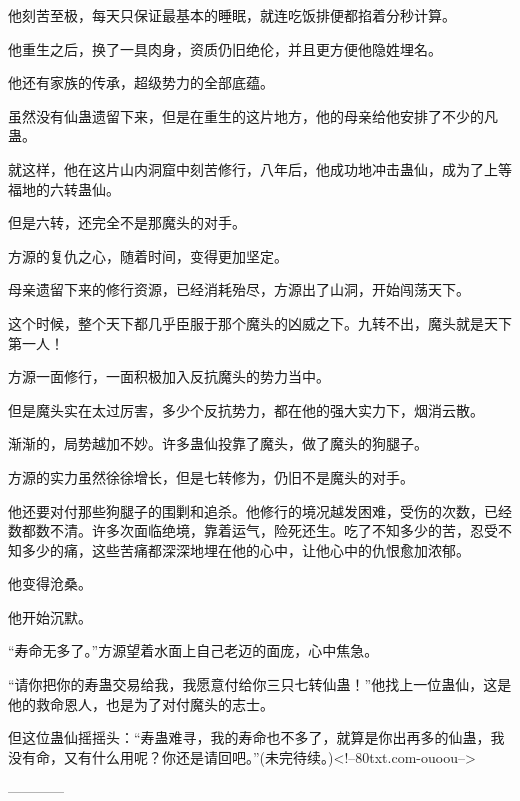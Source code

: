\begin{this_body}
他刻苦至极，每天只保证最基本的睡眠，就连吃饭排便都掐着分秒计算。

他重生之后，换了一具肉身，资质仍旧绝伦，并且更方便他隐姓埋名。

他还有家族的传承，超级势力的全部底蕴。

虽然没有仙蛊遗留下来，但是在重生的这片地方，他的母亲给他安排了不少的凡蛊。

就这样，他在这片山内洞窟中刻苦修行，八年后，他成功地冲击蛊仙，成为了上等福地的六转蛊仙。

但是六转，还完全不是那魔头的对手。

方源的复仇之心，随着时间，变得更加坚定。

母亲遗留下来的修行资源，已经消耗殆尽，方源出了山洞，开始闯荡天下。

这个时候，整个天下都几乎臣服于那个魔头的凶威之下。九转不出，魔头就是天下第一人！

方源一面修行，一面积极加入反抗魔头的势力当中。

但是魔头实在太过厉害，多少个反抗势力，都在他的强大实力下，烟消云散。

渐渐的，局势越加不妙。许多蛊仙投靠了魔头，做了魔头的狗腿子。

方源的实力虽然徐徐增长，但是七转修为，仍旧不是魔头的对手。

他还要对付那些狗腿子的围剿和追杀。他修行的境况越发困难，受伤的次数，已经数都数不清。许多次面临绝境，靠着运气，险死还生。吃了不知多少的苦，忍受不知多少的痛，这些苦痛都深深地埋在他的心中，让他心中的仇恨愈加浓郁。

他变得沧桑。

他开始沉默。

“寿命无多了。”方源望着水面上自己老迈的面庞，心中焦急。

“请你把你的寿蛊交易给我，我愿意付给你三只七转仙蛊！”他找上一位蛊仙，这是他的救命恩人，也是为了对付魔头的志士。

但这位蛊仙摇摇头：“寿蛊难寻，我的寿命也不多了，就算是你出再多的仙蛊，我没有命，又有什么用呢？你还是请回吧。”(未完待续。)<!--80txt.com-ouoou-->

------------

\end{this_body}

